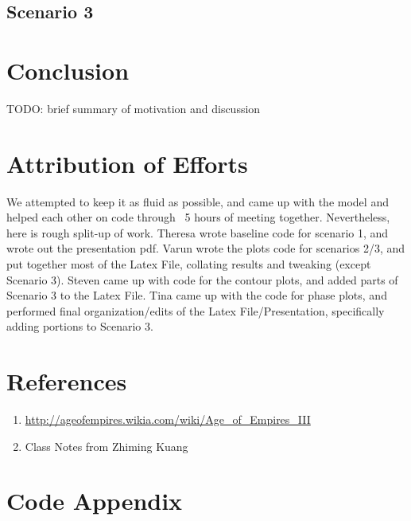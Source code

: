 \documentclass[12pt]{article}
\begin{document}
\subsection{Scenario 3}

\section{Conclusion} 
TODO: brief summary of motivation and discussion

\section{Attribution of Efforts} 
We attempted to keep it as fluid as possible, and came up with the model and helped each other on code through ~5 hours of meeting together. Nevertheless, here is rough split-up of work. Theresa wrote baseline code for scenario 1, and wrote out the presentation pdf. Varun wrote the plots code for scenarios 2/3, and put together most of the Latex File, collating results and tweaking (except Scenario 3). Steven came up with code for the contour plots, and added parts of Scenario 3 to the Latex File. Tina came up with the code for phase plots, and performed final organization/edits of the Latex File/Presentation, specifically adding portions to Scenario 3.

\section{References} 
\begin{enumerate}
\item \url{http://ageofempires.wikia.com/wiki/Age_of_Empires_III}
\item Class Notes from Zhiming Kuang
\end{enumerate}

\section{Code Appendix} 
\end{document}
